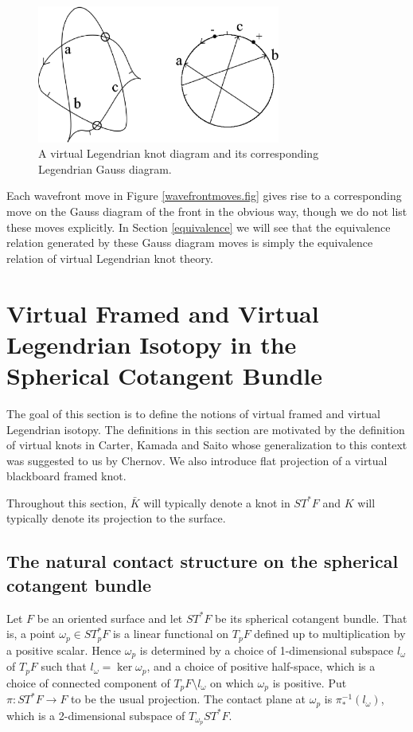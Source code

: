 \begin{figure}[htbp]
	\centering
	\includegraphics[width=8cm]{Gaussdiagram}
	\caption{A virtual Legendrian knot diagram and its corresponding Legendrian Gauss diagram.}
	\label{Gaussdiagram.fig}
\end{figure}

Each wavefront move in Figure \ref{wavefrontmoves.fig} gives rise to a corresponding move on the Gauss diagram of the front in the obvious way, though we do not list these moves explicitly.  In Section \ref{equivalence} we will see that the equivalence relation generated by these Gauss diagram moves is simply the equivalence relation of virtual Legendrian knot theory.


\section{Virtual Framed and Virtual Legendrian Isotopy in the Spherical Cotangent Bundle}
The goal of this section is to define the notions of virtual framed and virtual Legendrian isotopy.  The definitions in this section are motivated by the definition of virtual knots in Carter, Kamada and Saito \cite{CKS} whose generalization to this context was suggested to us by Chernov.  We also introduce flat projection of a virtual blackboard framed knot. 

Throughout this section, $\bar{K}$ will typically denote a knot in $ST^*F$ and $K$ will typically denote its projection to the surface.

\subsection{The natural contact structure on the spherical cotangent bundle} \label{defSTF}
Let $F$ be an oriented surface and let $ST^*F$ be its spherical cotangent bundle.  That is, a point $\omega_p\in ST_p^*F$ is a linear functional on $T_pF$ defined up to multiplication by a positive scalar.  Hence $\omega_p$ is determined by a choice of 1-dimensional subspace $l_\omega$ of $T_pF$ such that $l_{\omega}=\ker \omega_p$, and a choice of positive half-space, which is a choice of connected component of $T_pF\setminus l_\omega$ on which $\omega_p$ is positive.  Put $\pi: ST^*F\rightarrow F$ to be the usual projection.  The contact plane at $\omega_p$ is $\pi_*^{-1}(l_\omega)$, which is a 2-dimensional subspace of $T_{\omega_p}ST^*F$. 


